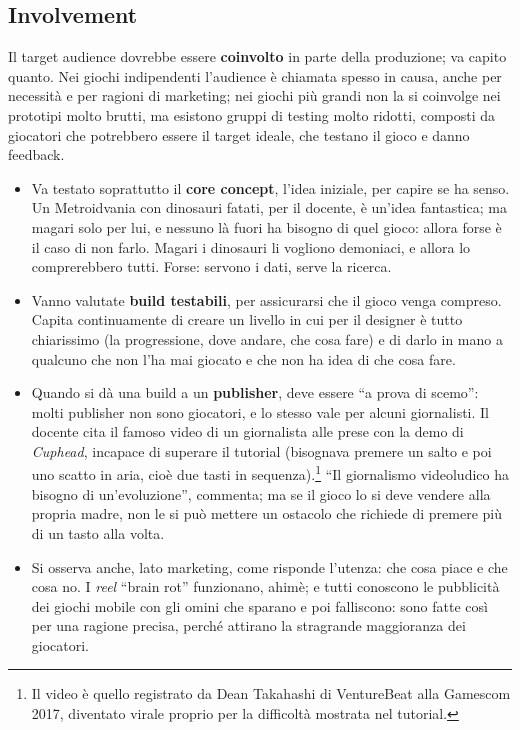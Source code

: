 \subsection{Involvement}

Il target audience dovrebbe essere \textbf{coinvolto} in parte della
produzione; va capito quanto. Nei giochi indipendenti l'audience è chiamata
spesso in causa, anche per necessità e per ragioni di marketing; nei giochi
più grandi non la si coinvolge nei prototipi molto brutti, ma esistono gruppi
di testing molto ridotti, composti da giocatori che potrebbero essere il
target ideale, che testano il gioco e danno feedback.

\begin{itemize}
  \item Va testato soprattutto il \textbf{core concept}, l'idea iniziale, per
        capire se ha senso. Un Metroidvania con dinosauri fatati, per il
        docente, è un'idea fantastica; ma magari solo per lui, e nessuno là
        fuori ha bisogno di quel gioco: allora forse è il caso di non farlo.
        Magari i dinosauri li vogliono demoniaci, e allora lo comprerebbero
        tutti. Forse: servono i dati, serve la ricerca.
  \item Vanno valutate \textbf{build testabili}, per assicurarsi che il gioco
        venga compreso. Capita continuamente di creare un livello in cui per
        il designer è tutto chiarissimo (la progressione, dove andare, che
        cosa fare) e di darlo in mano a qualcuno che non l'ha mai giocato e che
        non ha idea di che cosa fare.
  \item Quando si dà una build a un \textbf{publisher}, deve essere ``a prova
        di scemo'': molti publisher non sono giocatori, e lo stesso vale per
        alcuni giornalisti. Il docente cita il famoso video di un giornalista
        alle prese con la demo di \emph{Cuphead}, incapace di superare il
        tutorial (bisognava premere un salto e poi uno scatto in aria, cioè
        due tasti in sequenza).\footnote{Il video è quello registrato da Dean
        Takahashi di VentureBeat alla Gamescom 2017, diventato virale proprio
        per la difficoltà mostrata nel tutorial.} ``Il giornalismo videoludico
        ha bisogno di un'evoluzione'', commenta; ma se il gioco lo si deve
        vendere alla propria madre, non le si può mettere un ostacolo che
        richiede di premere più di un tasto alla volta.
  \item Si osserva anche, lato marketing, come risponde l'utenza: che cosa
        piace e che cosa no. I \emph{reel} ``brain rot'' funzionano, ahimè;
        e tutti conoscono le pubblicità dei giochi mobile con gli omini che
        sparano e poi falliscono: sono fatte così per una ragione precisa,
        perché attirano la stragrande maggioranza dei giocatori.
\end{itemize}

